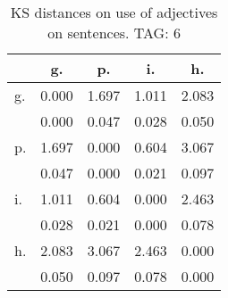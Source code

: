 \begin{table}[h!]
\begin{center}
\begin{tabular}{| l | c | c | c | c |}\hline
 & g. & p. & i. & h. \\\hline
g. & 0.000  & 1.697  & 1.011  & 2.083 \\\hline
 & 0.000  & 0.047  & 0.028  & 0.050 \\\hline
p. & 1.697  & 0.000  & 0.604  & 3.067 \\\hline
 & 0.047  & 0.000  & 0.021  & 0.097 \\\hline
i. & 1.011  & 0.604  & 0.000  & 2.463 \\\hline
 & 0.028  & 0.021  & 0.000  & 0.078 \\\hline
h. & 2.083  & 3.067  & 2.463  & 0.000 \\\hline
 & 0.050  & 0.097  & 0.078  & 0.000 \\\hline
\end{tabular}
\caption{KS distances on use of adjectives on sentences. TAG: 6}
\end{center}
\end{table}